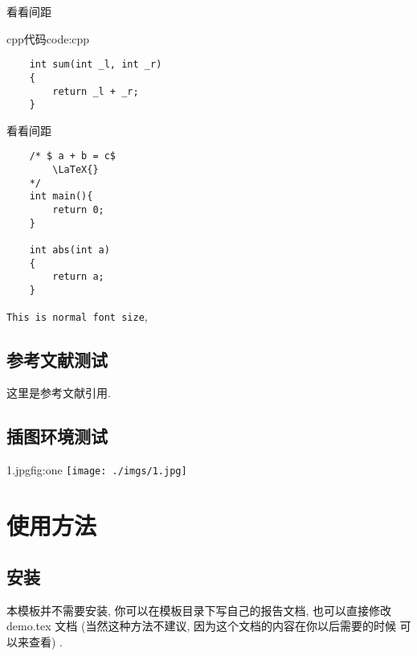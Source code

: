 \documentclass{cugrep}
\begin{document}
看看间距

\begin{tcodeenv}{cpp代码}{code:cpp}
    \begin{verbatim}
    int sum(int _l, int _r)
    {
        return _l + _r;
    }
    \end{verbatim}
\end{tcodeenv}

看看间距
\begin{verbatim}
    /* $ a + b = c$ 
        \LaTeX{}
    */
    int main(){
        return 0;
    }

    int abs(int a)
    {
        return a;
    }
\end{verbatim}

{\tt This is normal font size}, 

\section{参考文献测试}

这里是参考文献引用\cite{Zeiler2013}.

\section{插图环境测试}

\begin{tfig}{1.jpg}{fig:one}
    \texttt{[image: ./imgs/1.jpg]}
\end{tfig}
\chapter{使用方法}
\section{安装}
本模板并不需要安装, 你可以在模板目录下写自己的报告文档, 也可以直接修改 demo.tex 文档 (当然这种方法不建议, 因为这个文档的内容在你以后需要的时候
可以来查看) .
\end{document}
